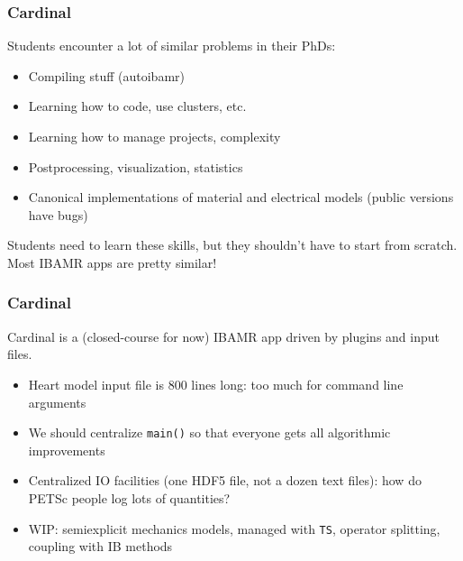 \documentclass[8pt]{beamer}
\begin{document}
\begin{frame}
    \frametitle{Cardinal}

    Students encounter a lot of similar problems in their PhDs:
    \vfill
    \begin{itemize}
      \item[$\blacksquare$] Compiling stuff (autoibamr)
        \vfill
      \item[$\blacksquare$] Learning how to code, use clusters, etc.
        \vfill
      \item[$\blacksquare$] Learning how to manage projects, complexity
        \vfill
      \item[$\blacksquare$] Postprocessing, visualization, statistics
        \vfill
      \item[$\blacksquare$] Canonical implementations of material and electrical
        models (public versions have bugs)
        \vfill
    \end{itemize}

    Students need to learn these skills, but they shouldn't have to start from
    scratch. Most IBAMR apps are pretty similar!
\end{frame}

\begin{frame}
    \frametitle{Cardinal}

    Cardinal is a (closed-course for now) IBAMR app driven by plugins and input
    files.
    \vfill
    \begin{itemize}
      \item[$\blacksquare$] Heart model input file is 800 lines long: too much
        for command line arguments
      \item[$\blacksquare$] We should centralize \texttt{main()} so that everyone gets
        all algorithmic improvements
      \item[$\blacksquare$] Centralized IO facilities (one HDF5 file, not a dozen
        text files): how do PETSc people log lots of quantities?
      \item[$\blacksquare$] WIP: semiexplicit mechanics models, managed with
        \texttt{TS}, operator splitting, coupling with IB methods
    \end{itemize}
\end{frame}
\end{document}
